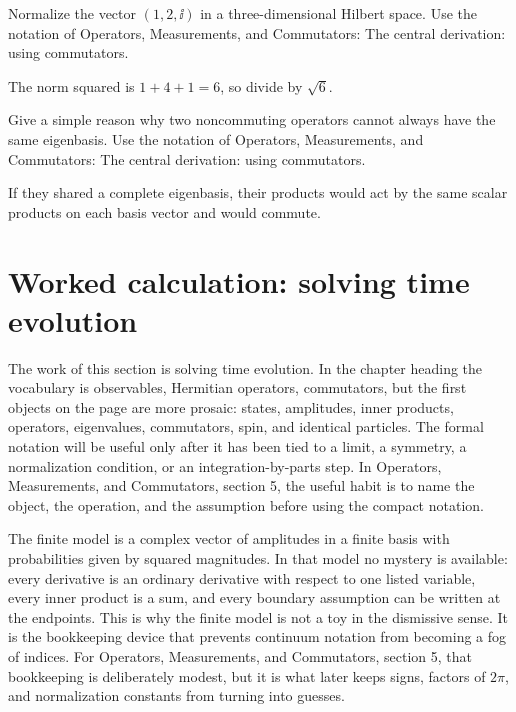 \begin{exercise}
Normalize the vector \((1,2,\ii)\) in a three-dimensional Hilbert space.  Use the notation of Operators, Measurements, and Commutators: The central derivation: using commutators.
\begin{answer}
The norm squared is \(1+4+1=6\), so divide by \(\sqrt6\).
\end{answer}
\end{exercise}

\begin{exercise}
Give a simple reason why two noncommuting operators cannot always have the same eigenbasis.  Use the notation of Operators, Measurements, and Commutators: The central derivation: using commutators.
\begin{answer}
If they shared a complete eigenbasis, their products would act by the same scalar products on each basis vector and would commute.
\end{answer}
\end{exercise}



\section{Worked calculation: solving time evolution}

The work of this section is solving time evolution.  In the chapter heading the vocabulary is observables, Hermitian operators, commutators, but the first objects on the page are more prosaic: states, amplitudes, inner products, operators, eigenvalues, commutators, spin, and identical particles.  The formal notation will be useful only after it has been tied to a limit, a symmetry, a normalization condition, or an integration-by-parts step.  In Operators, Measurements, and Commutators, section 5, the useful habit is to name the object, the operation, and the assumption before using the compact notation.

The finite model is a complex vector of amplitudes in a finite basis with probabilities given by squared magnitudes.  In that model no mystery is available: every derivative is an ordinary derivative with respect to one listed variable, every inner product is a sum, and every boundary assumption can be written at the endpoints.  This is why the finite model is not a toy in the dismissive sense.  It is the bookkeeping device that prevents continuum notation from becoming a fog of indices.  For Operators, Measurements, and Commutators, section 5, that bookkeeping is deliberately modest, but it is what later keeps signs, factors of \(2\pi\), and normalization constants from turning into guesses.


